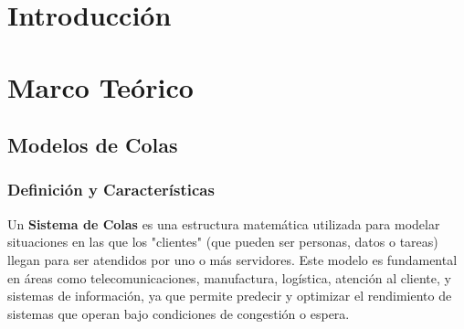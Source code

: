 \documentclass{article}
\begin{document}
\tableofcontents %

\newpage %



\section{Introducción}\label{sec:intr}



\section{Marco Teórico}\label{sec:marc}

\subsection{Modelos de Colas}
\subsubsection{Definición y Características}

Un \textbf{Sistema de Colas} es una estructura matemática utilizada para modelar situaciones en las que los "clientes" (que pueden ser personas, datos o tareas) llegan para ser atendidos por uno o más servidores. Este modelo es fundamental en áreas como telecomunicaciones, manufactura, logística, atención al cliente, y sistemas de información, ya que permite predecir y optimizar el rendimiento de sistemas que operan bajo condiciones de congestión o espera.
\end{document}

